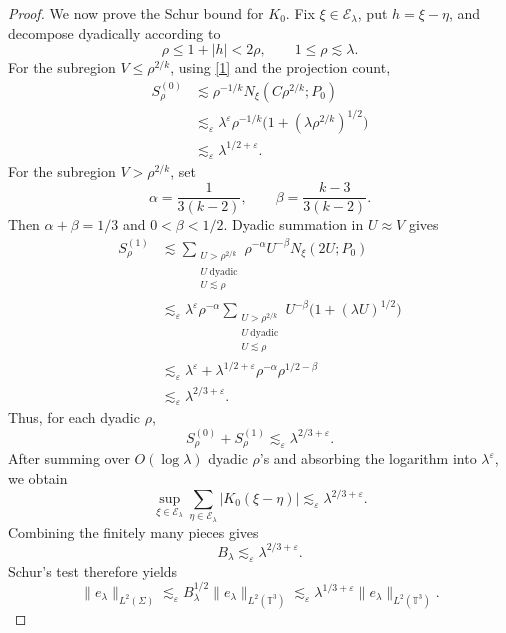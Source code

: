\documentclass[11pt,reqno]{amsart}
\numberwithin{equation}{section}
\newcommand{\1}{\textbf{1}}
\begin{document}
\begin{proof}
		We now prove the Schur bound for \(K_0\).  Fix
		\(\xi\in\mathcal E_\lambda\), put \(h=\xi-\eta\), and decompose dyadically
		according to
		\[
		\rho\le 1+|h|<2\rho,
		\qquad
		1\le \rho\lesssim \lambda.
		\]
		For the subregion \(V\le \rho^{2/k}\), using \eqref{1} and the projection
		count,
		\[
		\begin{aligned}
			S_\rho^{(0)}
			&\lesssim
			\rho^{-1/k}N_\xi(C\rho^{2/k};P_0)                         \\
			&\lesssim_\varepsilon
			\lambda^\varepsilon
			\rho^{-1/k}\bigl(1+(\lambda\rho^{2/k})^{1/2}\bigr)          \\
			&\lesssim_\varepsilon \lambda^{1/2+\varepsilon}.
		\end{aligned}
		\]
		For the subregion \(V>\rho^{2/k}\), set
		\[
		\alpha=\frac1{3(k-2)},
		\qquad
		\beta=\frac{k-3}{3(k-2)}.
		\]
		Then \(\alpha+\beta=1/3\) and \(0<\beta<1/2\).  Dyadic summation in
		\(U\approx V\) gives
		\[
		\begin{aligned}
			S_\rho^{(1)}
			&\lesssim
			\sum_{\substack{U>\rho^{2/k}\\ U\ \mathrm{dyadic}\\ U\lesssim\rho}}
			\rho^{-\alpha}U^{-\beta}N_\xi(2U;P_0)                     \\
			&\lesssim_\varepsilon
			\lambda^\varepsilon\rho^{-\alpha}
			\sum_{\substack{U>\rho^{2/k}\\ U\ \mathrm{dyadic}\\ U\lesssim\rho}}
			U^{-\beta}\bigl(1+(\lambda U)^{1/2}\bigr)                  \\
			&\lesssim_\varepsilon
			\lambda^\varepsilon
			+
			\lambda^{1/2+\varepsilon}\rho^{-\alpha}\rho^{1/2-\beta}   \\
			&
			\lesssim_\varepsilon
			\lambda^{2/3+\varepsilon}.
		\end{aligned}
		\]
		Thus, for each dyadic \(\rho\),
		\[
		S_\rho^{(0)}+S_\rho^{(1)}
		\lesssim_\varepsilon \lambda^{2/3+\varepsilon}.
		\]
		After summing over \(O(\log\lambda)\) dyadic \(\rho\)'s and absorbing the
		logarithm into \(\lambda^\varepsilon\), we obtain
		\[
		\sup_{\xi\in\mathcal E_\lambda}
		\sum_{\eta\in\mathcal E_\lambda}|K_0(\xi-\eta)|
		\lesssim_\varepsilon
		\lambda^{2/3+\varepsilon}.
		\]
		Combining the finitely many pieces gives
		\[
		B_\lambda\lesssim_\varepsilon \lambda^{2/3+\varepsilon}.
		\]
		Schur's test therefore yields
		\[
		\|e_\lambda\|_{L^2(\Sigma)}
		\lesssim_\varepsilon
		B_\lambda^{1/2}\|e_\lambda\|_{L^2(\mathbb T^3)}
		\lesssim_\varepsilon
		\lambda^{1/3+\varepsilon}
		\|e_\lambda\|_{L^2(\mathbb T^3)}.
		\]
	\end{proof}
	
\end{document}
